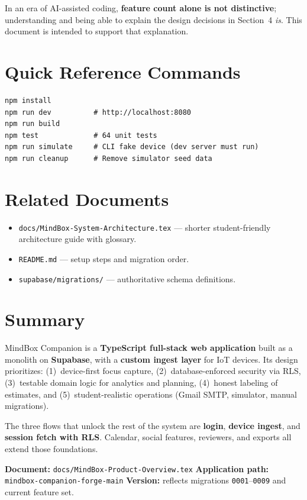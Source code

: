 \documentclass[11pt,a4paper]{article}
\newcommand{\filepath}[1]{\texttt{#1}}
\begin{document}
In an era of AI-assisted coding, \textbf{feature count alone is not distinctive}; understanding
and being able to explain the design decisions in Section~4 \emph{is}. This document is
intended to support that explanation.

\section{Quick Reference Commands}

\begin{lstlisting}
npm install
npm run dev          # http://localhost:8080
npm run build
npm test             # 64 unit tests
npm run simulate     # CLI fake device (dev server must run)
npm run cleanup      # Remove simulator seed data
\end{lstlisting}

\section{Related Documents}

\begin{itemize}[leftmargin=*]
  \item \filepath{docs/MindBox-System-Architecture.tex} --- shorter student-friendly architecture guide with glossary.
  \item \filepath{README.md} --- setup steps and migration order.
  \item \filepath{supabase/migrations/} --- authoritative schema definitions.
\end{itemize}

\section{Summary}

MindBox Companion is a \textbf{TypeScript full-stack web application} built as a monolith on
\textbf{Supabase}, with a \textbf{custom ingest layer} for IoT devices. Its design prioritizes:
(1)~device-first focus capture, (2)~database-enforced security via RLS, (3)~testable domain
logic for analytics and planning, (4)~honest labeling of estimates, and (5)~student-realistic
operations (Gmail SMTP, simulator, manual migrations).

The three flows that unlock the rest of the system are \textbf{login}, \textbf{device ingest},
and \textbf{session fetch with RLS}. Calendar, social features, reviewers, and exports all
extend those foundations.

\vspace{1em}
\noindent\textbf{Document:} \filepath{docs/MindBox-Product-Overview.tex} \quad
\textbf{Application path:} \filepath{mindbox-companion-forge-main} \quad
\textbf{Version:} reflects migrations \filepath{0001}--\filepath{0009} and current feature set.
\end{document}
